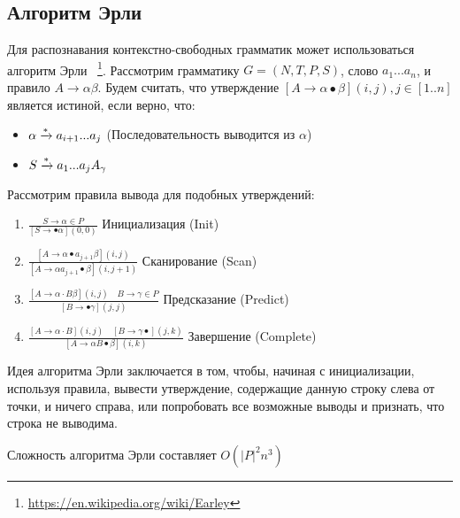 \subsection{Алгоритм Эрли}
Для распознавания контекстно-свободных грамматик может использоваться алгоритм Эрли~\cite{Earley} \footnote{\url{https://en.wikipedia.org/wiki/Earley}}.
Рассмотрим грамматику $G=(N,T,P,S)$, слово $a_1...a_n$,
и правило $A \rightarrow \alpha\beta$. Будем считать, что утверждение
$[A\rightarrow \alpha \bullet \beta](i,j), j \in [1..n]$ является истиной, если верно, что:
\begin{itemize}
	\item $\alpha \xrightarrow{\smash{*}} a_{i+1}...a_j$ (Последовательность выводится из $\alpha$)
	\item $S \xrightarrow{\smash{*}} a_1...a_jA_\gamma$ 
\end{itemize}


Рассмотрим правила вывода для подобных утверждений:

\begin{enumerate}
	\item $\frac{S \rightarrow \alpha \in P}{[S \rightarrow \bullet \alpha](0,0)}$ Инициализация (Init)
	
	\item $\frac{\left[A \rightarrow \alpha \bullet a_{j+1} \beta\right](i, j)}{\left[A \rightarrow \alpha a_{j+1} \bullet \beta\right](i, j+1)}$ Сканирование (Scan)
	
	\item $\frac{[A \rightarrow \alpha \cdot B \beta](i, j) \quad B \rightarrow \gamma \in P}{[B \rightarrow \bullet \gamma](j, j)}$ Предсказание (Predict)
	
	\item $\frac{[A \rightarrow \alpha \cdot B](i, j) \quad[B \rightarrow \gamma \bullet](j, k)}{[A \rightarrow \alpha B \bullet \beta](i, k)}$ Завершение (Complete)
	
\end{enumerate}

Идея алгоритма Эрли заключается в том, чтобы, начиная с инициализации, используя правила, вывести утверждение, содержащие данную строку слева от точки, и ничего справа, или попробовать все возможные выводы и признать, что строка не выводима.

Сложность алгоритма Эрли составляет $O(|P|^2n^3)$

